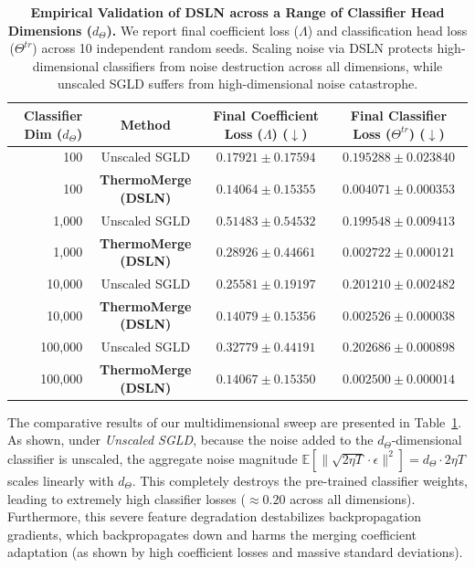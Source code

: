 \begin{table}[tb]
\caption{\textbf{Empirical Validation of DSLN across a Range of Classifier Head Dimensions ($d_{\Theta}$).} We report final coefficient loss ($\Lambda$) and classification head loss ($\Theta^{tr}$) across 10 independent random seeds. Scaling noise via DSLN protects high-dimensional classifiers from noise destruction across all dimensions, while unscaled SGLD suffers from high-dimensional noise catastrophe.}
\label{tab:dsln_results}
\vskip 0.15in
\begin{center}
\begin{small}
\begin{sc}
\begin{tabular}{rccc}
\toprule
Classifier Dim ($d_{\Theta}$) & Method & Final Coefficient Loss ($\Lambda$) ($\downarrow$) & Final Classifier Loss ($\Theta^{tr}$) ($\downarrow$) \\
\midrule
100 & Unscaled SGLD & $0.17921 \pm 0.17594$ & $0.195288 \pm 0.023840$ \\
100 & \textbf{ThermoMerge (DSLN)} & $\mathbf{0.14064 \pm 0.15355}$ & $\mathbf{0.004071 \pm 0.000353}$ \\
\midrule
1,000 & Unscaled SGLD & $0.51483 \pm 0.54532$ & $0.199548 \pm 0.009413$ \\
1,000 & \textbf{ThermoMerge (DSLN)} & $\mathbf{0.28926 \pm 0.44661}$ & $\mathbf{0.002722 \pm 0.000121}$ \\
\midrule
10,000 & Unscaled SGLD & $0.25581 \pm 0.19197$ & $0.201210 \pm 0.002482$ \\
10,000 & \textbf{ThermoMerge (DSLN)} & $\mathbf{0.14079 \pm 0.15356}$ & $\mathbf{0.002526 \pm 0.000038}$ \\
\midrule
100,000 & Unscaled SGLD & $0.32779 \pm 0.44191$ & $0.202686 \pm 0.000898$ \\
100,000 & \textbf{ThermoMerge (DSLN)} & $\mathbf{0.14067 \pm 0.15350}$ & $\mathbf{0.002500 \pm 0.000014}$ \\
\bottomrule
\end{tabular}
\end{sc}
\end{small}
\end{center}
\vskip -0.1in
\end{table}

The comparative results of our multidimensional sweep are presented in Table~\ref{tab:dsln_results}.
As shown, under \emph{Unscaled SGLD}, because the noise added to the $d_{\Theta}$-dimensional classifier is unscaled, the aggregate noise magnitude $\mathbb{E}[\|\sqrt{2\eta T}\cdot\epsilon\|^2] = d_{\Theta} \cdot 2\eta T$ scales linearly with $d_{\Theta}$.
This completely destroys the pre-trained classifier weights, leading to extremely high classifier losses ($\approx 0.20$ across all dimensions).
Furthermore, this severe feature degradation destabilizes backpropagation gradients, which backpropagates down and harms the merging coefficient adaptation (as shown by high coefficient losses and massive standard deviations).

